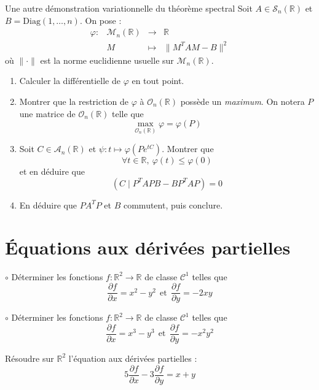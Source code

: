 \documentclass[french,a4paper]{article}
\newcommand{\R}{\mathbb{R}}
\theoremstyle{plain}
\theoremstyle{definition}
\theoremstyle{remark}
\begin{document}
\begin{ex}{Une autre démonstration variationnelle du théorème spectral}
	Soit $A\in\mathcal{S}_n(\R)$ et $B=\text{Diag}(1,\ldots,n)$. On pose : $$\begin{array}{lrcl}
		\varphi:&\mathcal{M}_n(\R)&\longrightarrow&\R\\
		&M&\longmapsto&\lVert M^TAM-B\rVert^2
	\end{array}$$ où $\lVert\cdot\rVert$ est la norme euclidienne usuelle sur $\mathcal{M}_n(\R)$.
	\begin{enumerate}
		\item Calculer la différentielle de $\varphi$ en tout point.
		\item Montrer que la restriction de $\varphi$ à $\mathcal{O}_n(\R)$ possède un \textit{maximum}. On notera $P$ une matrice de $\mathcal{O}_n(\R)$ telle que $$\underset{\mathcal{O}_n(\R)}{\max}\varphi=\varphi(P)$$
		\item Soit $C\in\mathcal{A}_n(\R)$ et $\psi:t\mapsto \varphi(Pe^{tC})$. Montrer que $$\forall t\in\R,\ \varphi(t)\leqslant\varphi(0)$$ et en déduire que $$\left(C\mid P^TAPB-BP^TAP\right)=0$$
		\item En déduire que $PA^TP$ et $B$ commutent, puis conclure.
	\end{enumerate}
\end{ex}

\section{Équations aux dérivées partielles}

\begin{ex}[Moulin.CD.54]{$\circ$}
	Déterminer les fonctions $f:\R^2\to\R$ de classe $\mathcal{C}^1$ telles que $$\frac{\partial f}{\partial x}=x^2-y^2\ \ \text{et}\ \ \frac{\partial f}{\partial y}=-2xy$$
\end{ex}

\begin{ex}[Moulin.CD.55]{$\circ$}
	Déterminer les fonctions $f:\R^2\to\R$ de classe $\mathcal{C}^1$ telles que $$\frac{\partial f}{\partial x}=x^3-y^3\ \ \text{et}\ \ \frac{\partial f}{\partial y}=-x^2y^2$$
\end{ex}

\begin{ex}[Moulin.CD.56]{}
	Résoudre sur $\R^2$ l'équation aux dérivées partielles : $$5\frac{\partial f}{\partial x}-3\frac{\partial f}{\partial y}=x+y$$
\end{ex}
\end{document}
